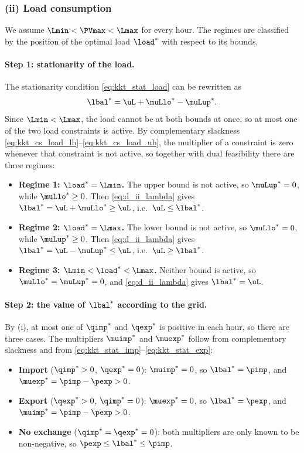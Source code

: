 \subsubsection{(ii) Load consumption}
We assume $\Lmin < \PVmax < \Lmax$ for every hour. The regimes are classified by the position
of the optimal load ${\load}^*$ with respect to its bounds.

\paragraph{Step 1: stationarity of the load.}
The stationarity condition \eqref{eq:kkt_stat_load} can be rewritten as
\begin{equation}
    {\lbal}^* = \uL + {\muLlo}^* - {\muLup}^*.
    \label{eq:d_ii_lambda}
\end{equation}
Since $\Lmin < \Lmax$, the load cannot be at both bounds at once, so at most one of the two
load constraints is active. By complementary slackness
\eqref{eq:kkt_cs_load_lb}--\eqref{eq:kkt_cs_load_ub}, the multiplier of a constraint is zero
whenever that constraint is not active, so together with dual feasibility there are three
regimes:
\begin{itemize}
    \item \textbf{Regime 1: ${\load}^* = \Lmin$.} The upper bound is not active, so
    ${\muLup}^* = 0$, while ${\muLlo}^* \geq 0$. Then \eqref{eq:d_ii_lambda} gives
    ${\lbal}^* = \uL + {\muLlo}^* \geq \uL$, i.e.\ $\uL \leq {\lbal}^*$.
    \item \textbf{Regime 2: ${\load}^* = \Lmax$.} The lower bound is not active, so
    ${\muLlo}^* = 0$, while ${\muLup}^* \geq 0$. Then \eqref{eq:d_ii_lambda} gives
    ${\lbal}^* = \uL - {\muLup}^* \leq \uL$, i.e.\ $\uL \geq {\lbal}^*$.
    \item \textbf{Regime 3: $\Lmin < {\load}^* < \Lmax$.} Neither bound is active, so
    ${\muLlo}^* = {\muLup}^* = 0$, and \eqref{eq:d_ii_lambda} gives ${\lbal}^* = \uL$.
\end{itemize}

\paragraph{Step 2: the value of $\lbal^*$ according to the grid.}
By (i), at most one of ${\qimp}^*$ and ${\qexp}^*$ is positive in each hour, so there are three
cases. The multipliers ${\muimp}^*$ and ${\muexp}^*$ follow from complementary slackness and
from \eqref{eq:kkt_stat_imp}--\eqref{eq:kkt_stat_exp}:
\begin{itemize}
    \item \textbf{Import} (${\qimp}^* > 0$, ${\qexp}^* = 0$): ${\muimp}^* = 0$, so
    ${\lbal}^* = \pimp$, and ${\muexp}^* = \pimp - \pexp > 0$.
    \item \textbf{Export} (${\qexp}^* > 0$, ${\qimp}^* = 0$): ${\muexp}^* = 0$, so
    ${\lbal}^* = \pexp$, and ${\muimp}^* = \pimp - \pexp > 0$.
    \item \textbf{No exchange} (${\qimp}^* = {\qexp}^* = 0$): both multipliers are only known
    to be non-negative, so $\pexp \leq {\lbal}^* \leq \pimp$.
\end{itemize}

